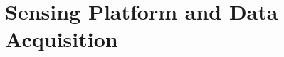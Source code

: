 \documentclass{erauthesis}
\begin{document}



\chapter{Sensing Platform and Data Acquisition} \label{sensing_platform}
\end{document}
